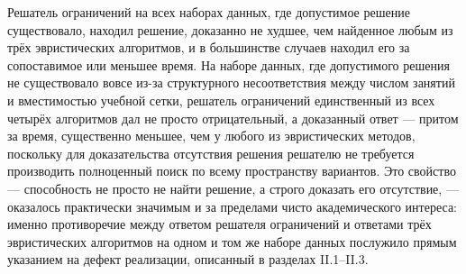 Решатель ограничений на всех наборах данных, где допустимое решение существовало, находил решение, доказанно не худшее, чем найденное любым из трёх эвристических алгоритмов, и в большинстве случаев находил его за сопоставимое или меньшее время. На наборе данных, где допустимого решения не существовало вовсе из-за структурного несоответствия между числом занятий и вместимостью учебной сетки, решатель ограничений единственный из всех четырёх алгоритмов дал не просто отрицательный, а доказанный ответ — притом за время, существенно меньшее, чем у любого из эвристических методов, поскольку для доказательства отсутствия решения решателю не требуется производить полноценный поиск по всему пространству вариантов. Это свойство — способность не просто не найти решение, а строго доказать его отсутствие, — оказалось практически значимым и за пределами чисто академического интереса: именно противоречие между ответом решателя ограничений и ответами трёх эвристических алгоритмов на одном и том же наборе данных послужило прямым указанием на дефект реализации, описанный в разделах II.1–II.3.

